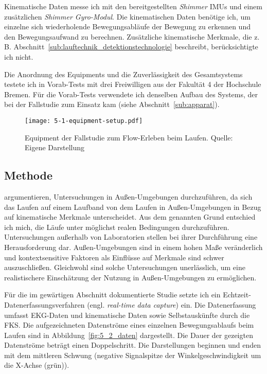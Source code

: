 Kinematische Daten messe ich mit den bereitgestellten \emph{Shimmer} \acp{IMU} und einem zusätzlichen \emph{Shimmer Gyro-Modul}. Die kinematischen Daten benötige ich, um einzelne sich wiederholende Bewegungsabläufe der Bewegung zu erkennen und den Bewegungsaufwand zu berechnen. Zusätzliche kinematische Merkmale, die z. B. Abschnitt~\ref{sub:lauftechnik_detektionstechnologie} beschreibt, berücksichtigte ich nicht.

Die Anordnung des Equipments und die Zuverlässigkeit des Gesamtsystems testete ich in Vorab-Tests mit drei Freiwilligen aus der Fakultät 4 der Hochschule Bremen. Für die Vorab-Tests verwendete ich denselben Aufbau des Systems, der bei der Fallstudie zum Einsatz kam (siehe Abschnitt~\ref{sub:apparat}).

\begin{figure}[t]
	\centering
		\texttt{[image: 5-1-equipment-setup.pdf]}
	\caption[Equipment der Fallstudie zum Flow-Erleben beim Laufen]{Equipment der Fallstudie zum Flow-Erleben beim Laufen. Quelle: Eigene Darstellung}
	\label{fig:5_1_equipment_setup}
\end{figure}

\subsection{Methode}

\citet{Strohrmann2012} argumentieren, Untersuchungen in Außen-Umgebungen durchzuführen, da sich das Laufen auf einem Laufband von dem Laufen in Außen-Umgebungen in Bezug auf kinematische Merkmale unterscheidet. Aus dem genannten Grund entschied ich mich, die Läufe unter möglichst realen Bedingungen durchzuführen. Untersuchungen außerhalb von Laboratorien stellen bei ihrer Durchführung eine Herausforderung dar. Außen-Umgebungen sind in einem hohen Maße veränderlich und kontextsensitive Faktoren als Einflüsse auf Merkmale sind schwer auszuschließen. Gleichwohl sind solche Untersuchungen unerlässlich, um eine realistischere Einschätzung der Nutzung in Außen-Umgebungen zu ermöglichen.

Für die im gewärtigen Abschnitt dokumentierte Studie setzte ich ein Echtzeit-Datenerfassungsverfahren (engl. \emph{real-time data capture}) ein. Die Datenerfassung umfasst \ac{EKG}-Daten und kinematische Daten sowie Selbstauskünfte durch die \ac{FKS}. Die aufgezeichneten Datenströme eines einzelnen Bewegungsablaufs beim Laufen sind in Abbildung~\ref{fig:5_2_daten} dargestellt. Die Dauer der gezeigten Datenströme beträgt einen Doppelschritt. Die Darstellungen beginnen und enden mit dem mittleren Schwung (negative Signalspitze der Winkelgeschwindigkeit um die X-Achse (grün)).

